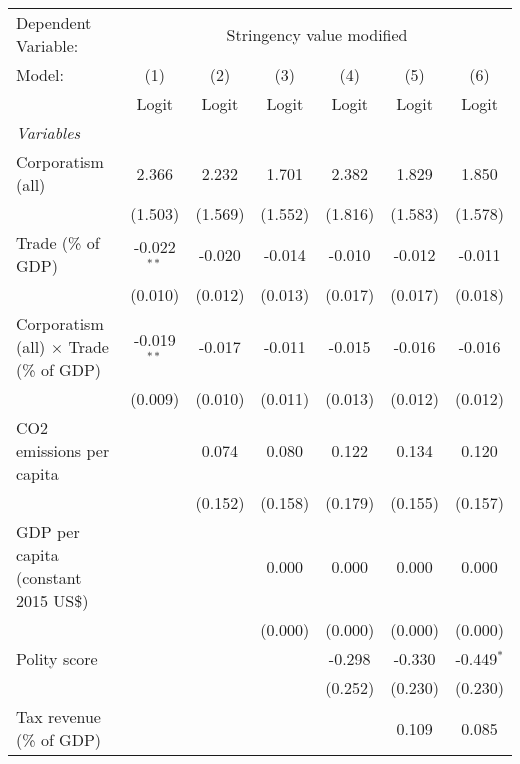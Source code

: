 
\begingroup
\centering
\begin{tabular}{lcccccc}
   \toprule
   Dependent Variable: & \multicolumn{6}{c}{Stringency value modified}\\
   Model:                                         & (1)           & (2)     & (3)     & (4)     & (5)     & (6)\\  
                                                  &  Logit        & Logit   & Logit   & Logit   & Logit   & Logit\\  
   \midrule
   \emph{Variables}\\
   Corporatism (all)                              & 2.366         & 2.232   & 1.701   & 2.382   & 1.829   & 1.850\\   
                                                  & (1.503)       & (1.569) & (1.552) & (1.816) & (1.583) & (1.578)\\   
   Trade (\% of GDP)                              & -0.022$^{**}$ & -0.020  & -0.014  & -0.010  & -0.012  & -0.011\\   
                                                  & (0.010)       & (0.012) & (0.013) & (0.017) & (0.017) & (0.018)\\   
   Corporatism (all) $\times$ Trade (\% of GDP)   & -0.019$^{**}$ & -0.017  & -0.011  & -0.015  & -0.016  & -0.016\\   
                                                  & (0.009)       & (0.010) & (0.011) & (0.013) & (0.012) & (0.012)\\   
   CO2 emissions per capita                       &               & 0.074   & 0.080   & 0.122   & 0.134   & 0.120\\   
                                                  &               & (0.152) & (0.158) & (0.179) & (0.155) & (0.157)\\   
   GDP per capita (constant 2015 US\$)            &               &         & 0.000   & 0.000   & 0.000   & 0.000\\   
                                                  &               &         & (0.000) & (0.000) & (0.000) & (0.000)\\   
   Polity score                                   &               &         &         & -0.298  & -0.330  & -0.449$^{*}$\\   
                                                  &               &         &         & (0.252) & (0.230) & (0.230)\\   
   Tax revenue (\% of GDP)                        &               &         &         &         & 0.109   & 0.085\\   

\end{tabular}
